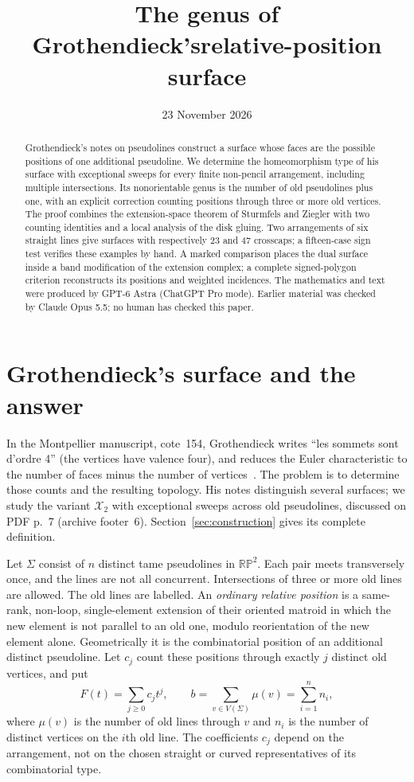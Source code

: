 \documentclass[11pt]{article}
\title{The genus of Grothendieck's\newline relative-position surface}
\author{}
\date{23 November 2026}
\theoremstyle{definition}\newtheorem{definition}[theorem]{Definition}
\newcommand{\RP}{\mathbb{RP}}
\begin{document}
\maketitle
\begin{abstract}
Grothendieck's notes on pseudolines construct a surface whose faces are
the possible positions of one additional pseudoline. We determine the
homeomorphism type of his surface with exceptional sweeps for every
finite non-pencil arrangement, including multiple intersections.
Its nonorientable genus is the number of old pseudolines plus one,
with an explicit correction counting positions through three or more
old vertices. The proof combines the extension-space theorem of
Sturmfels and Ziegler with two counting identities and a local analysis
of the disk gluing. Two arrangements of six straight lines give
surfaces with respectively 23 and 47 crosscaps; a fifteen-case sign
test verifies these examples by hand. A marked comparison places the
dual surface inside a band modification of the extension complex;
a complete signed-polygon criterion reconstructs its positions and
weighted incidences. The mathematics and text were
produced by GPT-6 Astra (ChatGPT Pro mode). Earlier material was
checked by Claude Opus 5.5; no human has checked this paper.
\end{abstract}

\section{Grothendieck's surface and the answer}
In the Montpellier manuscript, cote~154, Grothendieck writes
``les sommets sont d'ordre 4'' (the vertices have valence four),
and reduces the Euler characteristic to the number of faces minus
the number of vertices~\cite[PDF p.~120, archive footer~119,
handwritten p.~119]{Grothendieck154}.
The problem is to determine those counts and the resulting topology.
His notes distinguish several surfaces; we study the variant
$\mathcal X_2$ with exceptional sweeps across old pseudolines,
discussed on PDF p.~7 (archive footer~6).
Section~\ref{sec:construction} gives its complete definition.

Let $\Sigma$ consist of $n$ distinct tame pseudolines in $\RP^2$.
Each pair meets transversely once, and the lines are not all concurrent.
Intersections of three or more old lines are allowed. The old lines
are labelled. An \emph{ordinary relative position} is a same-rank,
non-loop, single-element extension of their oriented matroid in which
the new element is not parallel to an old one, modulo reorientation
of the new element alone. Geometrically it is the combinatorial
position of an additional distinct pseudoline. Let $c_j$ count these
positions through exactly $j$ distinct old vertices, and put
\[
 F(t)=\sum_{j\geq0}c_jt^j,\qquad
 b=\sum_{v\in V(\Sigma)}\mu(v)=\sum_{i=1}^n n_i,
\]
where $\mu(v)$ is the number of old lines through $v$ and $n_i$ is the
number of distinct vertices on the $i$th old line. The coefficients
$c_j$ depend on the arrangement, not on the chosen straight or curved
representatives of its combinatorial type.
\end{document}
